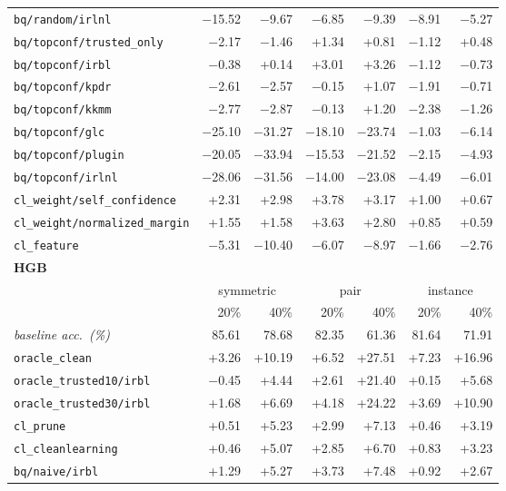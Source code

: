 \begin{tabular}{lrrrrrr}
\texttt{bq/random/irlnl} & $-$15.52 & $-$9.67 & $-$6.85 & $-$9.39 & $-$8.91 & $-$5.27 \\
\texttt{bq/topconf/trusted\_only} & $-$2.17 & $-$1.46 & +1.34 & +0.81 & $-$1.12 & +0.48 \\
\texttt{bq/topconf/irbl} & $-$0.38 & +0.14 & +3.01 & +3.26 & $-$1.12 & $-$0.73 \\
\texttt{bq/topconf/kpdr} & $-$2.61 & $-$2.57 & $-$0.15 & +1.07 & $-$1.91 & $-$0.71 \\
\texttt{bq/topconf/kkmm} & $-$2.77 & $-$2.87 & $-$0.13 & +1.20 & $-$2.38 & $-$1.26 \\
\texttt{bq/topconf/glc} & $-$25.10 & $-$31.27 & $-$18.10 & $-$23.74 & $-$1.03 & $-$6.14 \\
\texttt{bq/topconf/plugin} & $-$20.05 & $-$33.94 & $-$15.53 & $-$21.52 & $-$2.15 & $-$4.93 \\
\texttt{bq/topconf/irlnl} & $-$28.06 & $-$31.56 & $-$14.00 & $-$23.08 & $-$4.49 & $-$6.01 \\
\texttt{cl\_weight/self\_confidence} & +2.31 & +2.98 & +3.78 & +3.17 & +1.00 & +0.67 \\
\texttt{cl\_weight/normalized\_margin} & +1.55 & +1.58 & +3.63 & +2.80 & +0.85 & +0.59 \\
\texttt{cl\_feature} & $-$5.31 & $-$10.40 & $-$6.07 & $-$8.97 & $-$1.66 & $-$2.76 \\
\midrule
\multicolumn{7}{l}{\textbf{HGB}} \\
 & \multicolumn{2}{c}{symmetric} & \multicolumn{2}{c}{pair} & \multicolumn{2}{c}{instance} \\
\cmidrule(lr){2-3} \cmidrule(lr){4-5} \cmidrule(lr){6-7}
 & 20\% & 40\% & 20\% & 40\% & 20\% & 40\% \\
\midrule
\textit{baseline acc.\ (\%)} & 85.61 & 78.68 & 82.35 & 61.36 & 81.64 & 71.91 \\
\addlinespace
\texttt{oracle\_clean} & +3.26 & +10.19 & +6.52 & +27.51 & +7.23 & +16.96 \\
\texttt{oracle\_trusted10/irbl} & $-$0.45 & +4.44 & +2.61 & +21.40 & +0.15 & +5.68 \\
\texttt{oracle\_trusted30/irbl} & +1.68 & +6.69 & +4.18 & +24.22 & +3.69 & +10.90 \\
\texttt{cl\_prune} & +0.51 & +5.23 & +2.99 & +7.13 & +0.46 & +3.19 \\
\texttt{cl\_cleanlearning} & +0.46 & +5.07 & +2.85 & +6.70 & +0.83 & +3.23 \\
\texttt{bq/naive/irbl} & +1.29 & +5.27 & +3.73 & +7.48 & +0.92 & +2.67 \\

\end{tabular}
